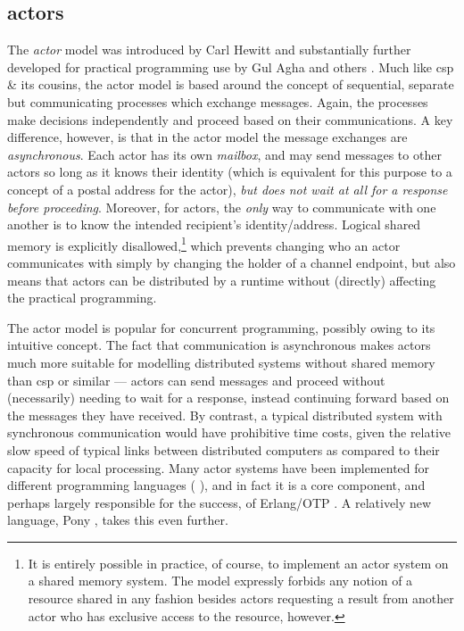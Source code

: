 \subsection{\label{subsec:back:actors}\texorpdfstring{\Glspl{actor}}{Actors}}
The \emph{\gls{actor}} model was introduced by Carl Hewitt \cite{Hewitt1973} and substantially further developed for practical programming use by Gul Agha and others \cite{Agha1986,Agha1997}.  Much like \gls{csp} \& its cousins, the \gls{actor} model is based around the concept of sequential, separate but communicating processes which exchange messages.  Again, the processes make decisions independently and proceed based on their communications.  A key difference, however, is that in the \gls{actor} model the message exchanges are \emph{asynchronous}.  Each \gls{actor} has its own \emph{mailbox}, and may send messages to other \glspl{actor} so long as it knows their identity (which is equivalent for this purpose to a concept of a postal address for the \gls{actor}), \emph{but does not wait at all for a response before proceeding}.  Moreover, for \glspl{actor}, the \emph{only} way to communicate with one another is to know the intended recipient's identity/address.  Logical shared memory is explicitly disallowed,\footnote{It is entirely possible in practice, of course, to implement an \gls{actor} system on a shared memory system.  The model expressly forbids any notion of a resource shared in any fashion besides \glspl{actor} requesting a result from another \gls{actor} who has exclusive access to the resource, however.} which prevents changing who an \gls{actor} communicates with simply by \eg{} changing the holder of a channel endpoint, but also means that actors can be distributed by a runtime without (directly) affecting the practical programming.

The \gls{actor} model is popular for concurrent programming, possibly owing to its intuitive concept.  The fact that communication is asynchronous makes \glspl{actor} much more suitable for modelling distributed systems without shared memory than \gls{csp} or similar --- \glspl{actor} can send messages and proceed without (necessarily) needing to wait for a response, instead continuing forward based on the messages they have received.  By contrast, a typical distributed system with synchronous communication would have prohibitive time costs, given the relative slow speed of typical links between distributed computers as compared to their capacity for local processing.  Many \gls{actor} systems have been implemented for different programming languages (\eg{} \cite{Varela2001,Srinivasan2008,Charousset2016,Bernstein2016}), and in fact it is a core component, and perhaps largely responsible for the success, of Erlang/OTP \cite{Armstrong2010,Armstrong2013,Vinoski2012}.  A relatively new language, Pony \cite{Clebsch2015,Clebsch2017}, takes this even further.

